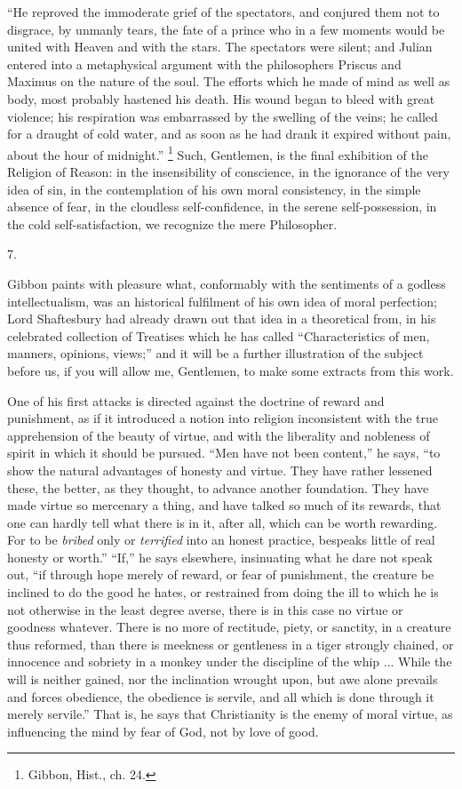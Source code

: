 ``He reproved the immoderate grief of the spectators, and
conjured them not to disgrace, by unmanly tears, the fate of a prince
who in a few moments would be united with Heaven and with the stars.
The spectators were silent; and Julian entered into a metaphysical
argument with the philosophers Priscus and Maximus on the nature of
the soul. The efforts which he made of mind as well as body, most
probably hastened his death. His wound began to bleed with great
violence; his respiration was embarrassed by the swelling of the
veins; he called for a draught of cold water, and as soon as he had
drank it expired without pain, about the hour of midnight.'' \footnote{Gibbon, Hist.,
ch. 24.} Such, Gentlemen, is the final exhibition of the Religion of
Reason: in the insensibility of conscience, in the ignorance of
the very idea of sin, in the contemplation of his own moral
consistency, in the simple absence of fear, in the cloudless
self-confidence, in the serene self-possession, in the cold
self-satisfaction, we recognize the mere Philosopher.

7.

Gibbon paints with pleasure what, conformably with the sentiments
of a godless intellectualism, was an historical fulfilment of his own
idea of moral perfection; Lord Shaftesbury had already drawn out that
idea in a theoretical from, in his celebrated collection of Treatises
which he has called ``Characteristics of men, manners, opinions,
views;'' and it will be a further illustration of the subject
before us, if you will allow me, Gentlemen, to make some extracts from
this work.

One of his first attacks is directed against the doctrine of reward
and punishment, as if it introduced a notion into religion
inconsistent with the true apprehension of the beauty of virtue, and
with the liberality and nobleness of spirit in which it should be
pursued. ``Men have not been content,'' he says, ``to show
the natural advantages of honesty and virtue. They have rather
lessened these, the better, as they thought, to advance another
foundation. They have made virtue so mercenary a thing, and have
talked so much of its rewards, that one can hardly tell what there is
in it, after all, which can be worth rewarding. For to be \emph{bribed}
only or \emph{terrified} into an honest practice, bespeaks little of
real honesty or worth.'' ``If,'' he says elsewhere,
insinuating what he dare not speak out, ``if through hope merely
of reward, or fear of punishment, the creature be inclined to do the
good he hates, or restrained from doing the ill to which he is not
otherwise in the least degree averse, there is in this case no
virtue or goodness whatever. There is no more of rectitude, piety, or
sanctity, in a creature thus reformed, than there is meekness or
gentleness in a tiger strongly chained, or innocence and sobriety in a
monkey under the discipline of the whip ... While the will is neither
gained, nor the inclination wrought upon, but awe alone prevails and
forces obedience, the obedience is servile, and all which is done
through it merely servile.'' That is, he says that Christianity is
the enemy of moral virtue, as influencing the mind by fear of God, not
by love of good.

